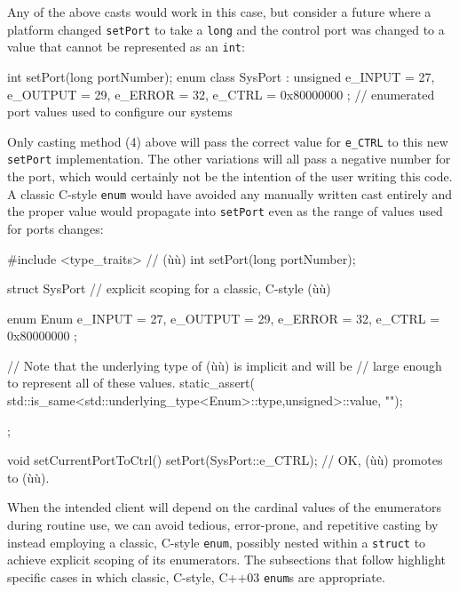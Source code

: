 \noindent Any of the above casts would work in this case, but consider a future
where a platform changed \texttt{setPort} to take a \texttt{long} and
the control port was changed to a value that cannot be represented as an
\texttt{int}:

\begin{emcppslisting}
int setPort(long portNumber);
enum class SysPort : unsigned { e_INPUT = 27, e_OUTPUT = 29, e_ERROR = 32,
                                e_CTRL = 0x80000000 };
    // enumerated port values used to configure our systems
\end{emcppslisting}

\noindent Only casting method (4) above will pass the correct value for
\texttt{e\_CTRL} to this new \texttt{setPort} implementation. The other
variations will all pass a negative number for the port, which would
certainly not be the intention of the user writing this code. A classic
C-style \texttt{enum} would have avoided any manually written cast
entirely and the proper value would propagate into \texttt{setPort} even
as the range of values used for ports changes:

\begin{emcppshiddenlisting}[emcppsbatch=e12]
#include <type_traits>  // (ù{}ù)
int setPort(long portNumber);
\end{emcppshiddenlisting}
\begin{emcppslisting}[emcppsbatch=e12]
struct SysPort  // explicit scoping for a classic, C-style (ù{}ù)
{
    enum Enum { e_INPUT = 27, e_OUTPUT = 29, e_ERROR = 32,
                e_CTRL = 0x80000000 };

    // Note that the underlying type of (ù{}ù) is implicit and will be
    // large enough to represent all of these values.
    static_assert(
        std::is_same<std::underlying_type<Enum>::type,unsigned>::value, "");
};

void setCurrentPortToCtrl()
{
    setPort(SysPort::e_CTRL);  // OK, (ù{}ù) promotes to (ù{}ù).
}
\end{emcppslisting}

\noindent When the intended client will depend on the cardinal values of the
enumerators during routine use, we can avoid tedious, error-prone, and
repetitive casting by instead employing a classic, C-style
\texttt{enum}, possibly nested within a \texttt{struct} to achieve
explicit scoping of its enumerators. The subsections that follow
highlight specific cases in which classic, C-style, C++03
\texttt{enum}s are appropriate.

